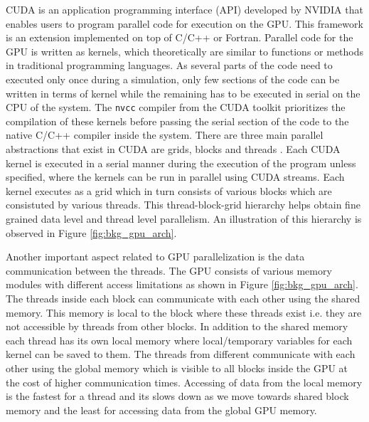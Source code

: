 \documentclass[preprint,10pt,authoryear,review]{elsarticle}
\begin{document}
\begin{linenumbers}
CUDA is an application programming interface (API) developed by NVIDIA \citep{NVIDIA2012} 
that enables users to program parallel code for execution on the GPU. This framework is an 
extension implemented on top of C/C++ or Fortran. Parallel code for the GPU is written 
as kernels, which theoretically are similar to functions or methods in traditional 
programming languages. As several parts of the code need to executed only once during a simulation, 
only few sections of the code can be written in terms of kernel while the remaining has 
to be executed in serial on the CPU of the system. The \texttt{nvcc} 
compiler from the CUDA toolkit prioritizes the compilation of these kernels before 
passing the serial section of the code to the native C/C++ compiler inside the system. 
There are three main parallel abstractions that exist in CUDA are grids, blocks and 
threads \citep{santos2013}. Each CUDA kernel is executed in a serial manner during the execution 
of the program unless specified, where the kernels can be run in parallel using CUDA 
streams. Each kernel executes as a grid which in turn consists of various blocks which 
are consistuted by various threads. This thread-block-grid hierarchy helps obtain fine 
grained data level and thread level parallelism. An illustration of this hierarchy is 
observed in Figure \ref{fig:bkg_gpu_arch}.

Another important aspect related to GPU parallelization is the data communication between the threads. 
The GPU consists of various memory modules with different access limitations as shown in Figure 
\ref{fig:bkg_gpu_arch}. The threads inside each block can communicate with each other using the 
shared memory. This memory is local to the block where these threads exist i.e. they are not 
accessible by threads from other blocks. In addition to the shared memory each thread has its 
own local memory where local/temporary variables for each kernel can be saved to them. 
The threads from different communicate with each other using the global memory which is visible to 
all blocks inside the GPU at the cost of higher communication times. Accessing of data from the 
local memory is the fastest for a thread and its slows down as we move towards shared block memory 
and the least for accessing data from the global GPU memory. 



\end{linenumbers}
\end{document}
